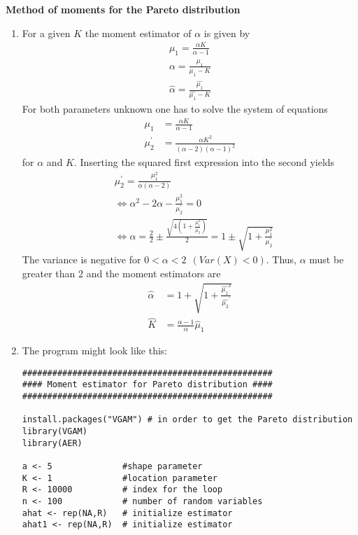 \documentclass{article}
\begin{document}
\begin{solution}
\textbf{Method of moments for the Pareto distribution}

\begin{enumerate}
  \item For a given $K$ the moment estimator of $\alpha$ is given by
      \begin{align*}
        \mu_1 = \frac{\alpha K}{\alpha - 1}\\
        \alpha = \frac{\mu_1}{\mu_1-K}\\
        \hat{\alpha} = \frac{\hat{\mu_1}}{\hat{\mu_1}-K}
      \end{align*}
      For both parameters unknown one has to solve the system of
      equations
      \begin{align*}
        \mu_1 &= \frac{\alpha K}{\alpha - 1}\\
        \mu_{2}^{\prime} &= \frac{\alpha K^2}{(\alpha-2)(\alpha-1)^2}
      \end{align*}
      for $\alpha$ and $K$. Inserting the squared first expression into
      the second yields
      \begin{align*}
        &\mu_{2}^{\prime} = \frac{\mu_1^2}{\alpha(\alpha-2)}\\
        &\Leftrightarrow\alpha^2-2\alpha-\frac{\mu_1^2}{\mu_{2}^{\prime}}=0\\
        &\Leftrightarrow\alpha = \frac{2}{2} \pm \frac{\sqrt{4(1+\frac{\mu_1^2}{\mu_{2}^{\prime}})}}{2}=1\pm \sqrt{1+\frac{\mu_1^2}{\mu_{2}^{\prime}}}
      \end{align*}
      The variance is negative for $0<\alpha<2~~ (Var(X)<0)$. Thus,
      $\alpha$ must be greater than 2 and the moment estimators are
      \begin{align*}
        \hat{\alpha} &= 1 + \sqrt{1+\frac{\hat{\mu_1}^2}{\hat{\mu_{2}}^{\prime}}}\\
        \hat{K} &= \frac{\alpha-1}{\alpha}\hat{\mu}_1
      \end{align*}
  \item The program might look like this:

\begin{verbatim}
##################################################
#### Moment estimator for Pareto distribution ####
##################################################

install.packages("VGAM") # in order to get the Pareto distribution
library(VGAM)
library(AER)

a <- 5              #shape parameter
K <- 1              #location parameter
R <- 10000          # index for the loop
n <- 100            # number of random variables
ahat <- rep(NA,R)   # initialize estimator
ahat1 <- rep(NA,R)  # initialize estimator


\end{verbatim}
\end{enumerate}
\end{solution}
\end{document}
